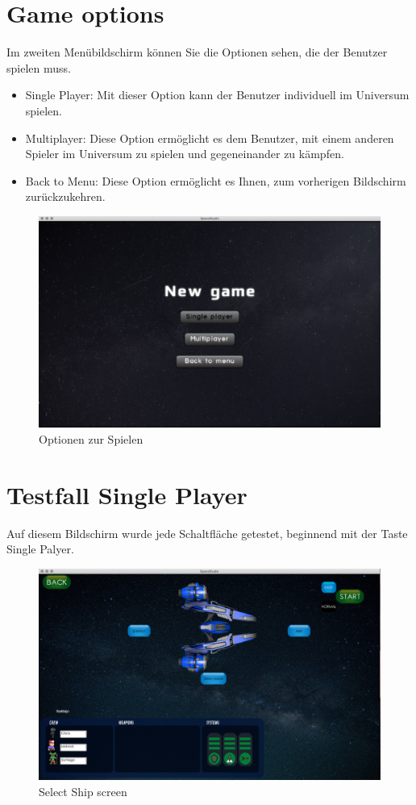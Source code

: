 \documentclass[12pt]{article}
\begin{document}
\section{Game options}
Im zweiten Menübildschirm können Sie die Optionen sehen, die der Benutzer spielen muss.
\begin{itemize}
\item Single Player: Mit dieser Option kann der Benutzer individuell im Universum spielen.
\item Multiplayer: Diese Option ermöglicht es dem Benutzer, mit einem anderen Spieler im Universum zu spielen und gegeneinander zu kämpfen.
\item Back to Menu: Diese Option ermöglicht es Ihnen, zum vorherigen Bildschirm zurückzukehren.
\end{itemize}
\begin{figure}[h]
\centering
\includegraphics[scale=0.3]{TestProtocolBilder/menuScreenTwo.png}
\caption{Optionen zur Spielen}
\end{figure}
\newpage
\section{Testfall Single Player}
Auf diesem Bildschirm wurde jede Schaltfläche getestet, beginnend mit der Taste Single Palyer.\\
\begin{figure}[h]
\centering
\includegraphics[scale=0.3]{TestProtocolBilder/selecShipScreen.png}
\caption{Select Ship screen}
\end{figure}
\newpage
\end{document}
